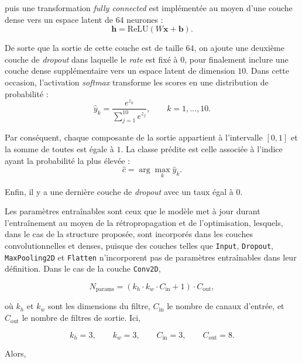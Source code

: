 puis une transformation \textit{fully connected} est implémentée au moyen d’une couche dense vers un espace latent de $64$ neurones :
\begin{equation}
\mathbf{h}=\mathrm{ReLU}(W\mathbf{x}+\mathbf{b}).
\end{equation}

De sorte que la sortie de cette couche est de taille $64$, on ajoute une deuxième couche de \textit{dropout} dans laquelle le \textit{rate} est fixé à $0$, pour finalement inclure une couche dense supplémentaire vers un espace latent de dimension $10$. Dans cette occasion, l’activation \textit{softmax} transforme les scores en une distribution de probabilité :
\begin{equation}
\hat{y}_k=\frac{e^{z_k}}{\sum_{j=1}^{10} e^{z_j}},
\qquad
k=1,\dots,10.
\end{equation}

Par conséquent, chaque composante de la sortie appartient à l’intervalle $[0,1]$ et la somme de toutes est égale à $1$. La classe prédite est celle associée à l’indice ayant la probabilité la plus élevée :
\begin{equation}
\hat{c}=\arg\max_k \hat{y}_k.
\end{equation}

Enfin, il y a une dernière couche de \textit{dropout} avec un taux égal à $0$.

Les paramètres entraînables sont ceux que le modèle met à jour durant l’entraînement au moyen de la rétropropagation et de l’optimisation, lesquels, dans le cas de la structure proposée, sont incorporés dans les couches convolutionnelles et denses, puisque des couches telles que \texttt{Input}, \texttt{Dropout}, \texttt{MaxPooling2D} et \texttt{Flatten} n’incorporent pas de paramètres entraînables dans leur définition. Dans le cas de la couche \texttt{Conv2D},

\begin{equation}
N_{\text{params}}=(k_h\cdot k_w\cdot C_{\text{in}}+1)\cdot C_{\text{out}},
\end{equation}

où $k_h$ et $k_w$ sont les dimensions du filtre, $C_{\text{in}}$ le nombre de canaux d’entrée, et $C_{\text{out}}$ le nombre de filtres de sortie. Ici,

\begin{equation}
k_h=3,\qquad k_w=3,\qquad C_{\text{in}}=3,\qquad C_{\text{out}}=8.
\end{equation}

Alors,


